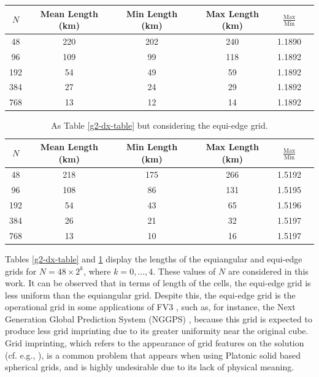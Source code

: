 \documentclass[preprint,12pt]{elsarticle}
\begin{document}
\begin{linenumbers}
\begin{table}[htbp]
	\begin{tabular}{|c|c|c|c|c|c}\hline
		$N$ & Mean Length (km) & Min Length (km) & Max Length (km) & $\frac{\text{Max}}{\text{Min}}$ \\ \hline
		48 & 220 & 202 & 240 & 1.1890 \\
		96 & 109 & 99 & 118  & 1.1892 \\
		192 & 54 & 49 & 59  & 1.1892 \\
		384 & 27 & 24 & 29  & 1.1892 \\
		768 & 13 & 12 & 14  & 1.1892\\
		\hline
	\end{tabular} 
\end{table}
\begin{table}[htbp]
	\centering
	\caption{As Table \ref{g2-dx-table} but considering the equi-edge grid. \label{g0-dx-table}}
	\begin{tabular}{|c|c|c|c|c|c}\hline
		$N$ & Mean Length (km) & Min Length (km) & Max Length (km) & $\frac{\text{Max}}{\text{Min}}$ \\ \hline 
		48 & 218 & 175 & 266 & 1.5192 \\
		96 & 108 & 86 & 131 & 1.5195 \\
		192 & 54 & 43 & 65 & 1.5196 \\
		384 & 26 & 21 & 32 & 1.5197 \\
		768 & 13 & 10 & 16 & 1.5197 \\
		\hline
	\end{tabular}
\end{table}

Tables  \ref{g2-dx-table} and \ref{g0-dx-table} display the lengths of the  equiangular and equi-edge grids for $N=48\times 2^k$, 
where $k = 0,\ldots, 4$. These values of $N$ are considered in this work.
It can be observed that in terms of length of the cells, the equi-edge grid is less uniform than the equiangular grid.
Despite this, the equi-edge grid is the operational grid in some applications of FV3 \cite{harris:2021,chen:2021}, such as, for instance, 
the Next Generation Global Prediction System (NGGPS) \cite{zhou:2019}, 
because this grid is expected to produce less grid imprinting due to its greater uniformity near the original cube.
Grid imprinting, which refers to the appearance of grid features on the solution (cf. e.g., \cite{peixoto:2013, weller:2012, mouallem:2023}),  is a common problem that appears when using Platonic solid based spherical grids,  and is highly undesirable due to its lack of physical meaning.


\end{linenumbers}
\end{document}
